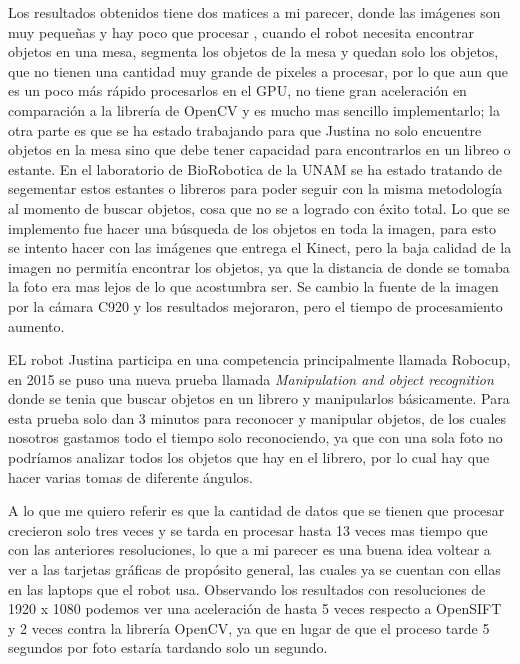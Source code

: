  
 Los resultados obtenidos tiene dos matices a mi parecer, donde las imágenes son muy pequeñas y hay poco que procesar , cuando el robot necesita encontrar objetos en una mesa, segmenta los objetos de la mesa y quedan solo los objetos, que no tienen una cantidad muy grande de pixeles a procesar, por lo que aun que es un poco más rápido procesarlos en el GPU, no tiene gran aceleración en comparación a la librería de OpenCV y es mucho mas sencillo implementarlo; la otra parte es que se ha estado trabajando para que Justina no solo encuentre objetos en la mesa sino que debe tener capacidad para encontrarlos en un libreo o estante. En el laboratorio de BioRobotica de la UNAM  se ha estado tratando de segementar estos estantes o libreros para poder seguir con la misma metodología al momento de buscar objetos, cosa que no se a logrado con éxito total. Lo que se implemento fue hacer una búsqueda de los objetos en toda la imagen, para esto se intento hacer con las imágenes que entrega el Kinect, pero la baja calidad de la imagen no permitía encontrar los objetos, ya que la distancia de donde se tomaba la foto era mas lejos de lo que acostumbra ser.
 Se cambio la fuente de la imagen por la cámara C920 y los resultados mejoraron, pero el tiempo de procesamiento aumento.

EL robot Justina participa en una competencia principalmente llamada Robocup, en 2015 se puso una nueva prueba llamada  \textit{Manipulation and object recognition} donde se tenia que buscar objetos en un librero y manipularlos básicamente. Para esta prueba solo dan 3 minutos para reconocer y manipular objetos,  de los cuales nosotros gastamos todo el tiempo solo reconociendo, ya que con una sola foto no podríamos analizar todos los objetos que  hay en el librero, por lo cual hay que hacer varias tomas de diferente ángulos.


 
 A lo que me quiero referir es que la cantidad de datos que se tienen que procesar crecieron solo tres veces y se tarda en procesar hasta 13 veces mas tiempo que con las anteriores resoluciones, lo que a mi parecer es una buena idea voltear a ver a las tarjetas gráficas de propósito general, las cuales ya se cuentan con ellas en las laptops que el robot usa. Observando los resultados con resoluciones de 1920 x 1080 podemos ver una aceleración de hasta 5 veces respecto a OpenSIFT y 2 veces contra la librería OpenCV, ya que en lugar de que el proceso tarde 5 segundos por foto estaría tardando solo un segundo.  
 
  





 
 
 
 
 
 
 
 
 

